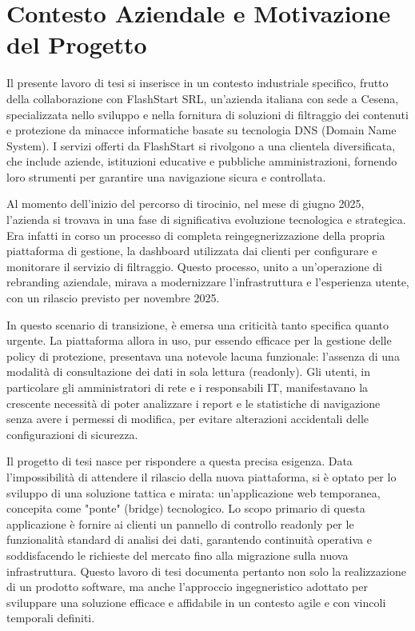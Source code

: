 \documentclass[12pt,a4paper,openright,twoside]{book}
\begin{document}
\section{Contesto Aziendale e Motivazione del Progetto}
\label{sec:contesto_e_motivazione}

Il presente lavoro di tesi si inserisce in un contesto industriale specifico, frutto della collaborazione con FlashStart SRL, un'azienda italiana con sede a Cesena, specializzata nello sviluppo e nella fornitura di soluzioni di filtraggio dei contenuti e protezione da minacce informatiche basate su tecnologia DNS (Domain Name System). I servizi offerti da FlashStart si rivolgono a una clientela diversificata, che include aziende, istituzioni educative e pubbliche amministrazioni, fornendo loro strumenti per garantire una navigazione sicura e controllata.

Al momento dell'inizio del percorso di tirocinio, nel mese di giugno 2025, l'azienda si trovava in una fase di significativa evoluzione tecnologica e strategica. Era infatti in corso un processo di completa reingegnerizzazione della propria piattaforma di gestione, la dashboard utilizzata dai clienti per configurare e monitorare il servizio di filtraggio. Questo processo, unito a un'operazione di rebranding aziendale, mirava a modernizzare l'infrastruttura e l'esperienza utente, con un rilascio previsto per novembre 2025.

In questo scenario di transizione, è emersa una criticità tanto specifica quanto urgente. La piattaforma allora in uso, pur essendo efficace per la gestione delle policy di protezione, presentava una notevole lacuna funzionale: l'assenza di una modalità di consultazione dei dati in sola lettura (readonly). Gli utenti, in particolare gli amministratori di rete e i responsabili IT, manifestavano la crescente necessità di poter analizzare i report e le statistiche di navigazione senza avere i permessi di modifica, per evitare alterazioni accidentali delle configurazioni di sicurezza.

Il progetto di tesi nasce per rispondere a questa precisa esigenza. Data l'impossibilità di attendere il rilascio della nuova piattaforma, si è optato per lo sviluppo di una soluzione tattica e mirata: un'applicazione web temporanea, concepita come "ponte" (bridge) tecnologico. Lo scopo primario di questa applicazione è fornire ai clienti un pannello di controllo readonly per le funzionalità standard di analisi dei dati, garantendo continuità operativa e soddisfacendo le richieste del mercato fino alla migrazione sulla nuova infrastruttura. Questo lavoro di tesi documenta pertanto non solo la realizzazione di un prodotto software, ma anche l'approccio ingegneristico adottato per sviluppare una soluzione efficace e affidabile in un contesto agile e con vincoli temporali definiti.
\end{document}
